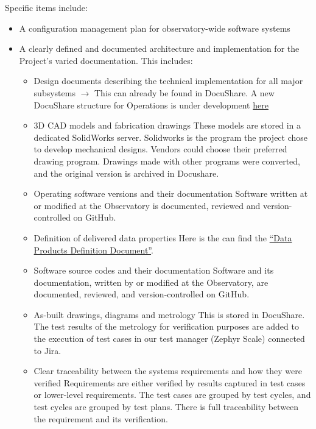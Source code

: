 Specific items include:

\begin{itemize}
	\item A configuration management plan for observatory-wide software systems

	\item A clearly defined and documented architecture and implementation for the Project's varied documentation.  This includes:
	\begin{itemize}
		\item Design documents describing the technical implementation for all major subsystems\newline
		$\rightarrow$ This can already be found in DocuShare.
		A new DocuShare structure for Operations is under development \href{https://docushare.lsst.org/docushare/dsweb/View/Collection-15974}{here}

		\item 3D CAD models and fabrication drawings
		These models are stored in a dedicated SolidWorks server. Solidworks is the program the project chose to develop mechanical designs.
		Vendors could choose their preferred drawing program. Drawings made with other programs were converted, and the original version is archived in Docushare.

		\item Operating software versions and their documentation
		Software written at or modified at the Observatory is documented, reviewed and version-controlled on GitHub.

		\item Definition of delivered data properties
		Here is the can find the \href{ls.st/dpdd}{“Data Products Definition Document”}.
		\item Software source codes and their documentation
		Software and its documentation, written by or modified at the Observatory, are documented, reviewed, and version-controlled on GitHub.

		\item As-built drawings, diagrams and metrology
		This is stored in DocuShare.
		The test results of the metrology for verification purposes are added to the execution of test cases in our test manager (Zephyr Scale) connected to Jira.

		\item Clear traceability between the systems requirements and how they were verified
		Requirements are either verified by results captured in test cases or lower-level requirements.
		The test cases are grouped by test cycles, and test cycles are grouped by test plans.
		There is full traceability between the requirement and its verification.


\end{itemize}
\end{itemize}
